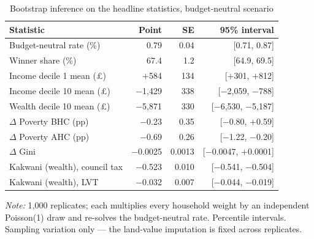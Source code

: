 \begin{table}[htbp]
\centering
\caption{Bootstrap inference on the headline statistics, budget-neutral scenario}
\label{tab:headline_ci}
\begin{tabular}{lrrr}
\toprule
Statistic & Point & SE & 95\% interval \\
\midrule
Budget-neutral rate (\%)                 & 0.79    & 0.04   & [0.71, 0.87] \\
Winner share (\%)                        & 67.4    & 1.2    & [64.9, 69.5] \\
Income decile 1 mean (\pounds)           & $+$584  & 134    & [$+$301, $+$812] \\
Income decile 10 mean (\pounds)          & $-$1{,}429 & 338 & [$-$2{,}059, $-$788] \\
Wealth decile 10 mean (\pounds)          & $-$5{,}871 & 330 & [$-$6{,}530, $-$5{,}187] \\
$\Delta$ Poverty BHC (pp)                & $-$0.23 & 0.35   & [$-$0.80, $+$0.59] \\
$\Delta$ Poverty AHC (pp)                & $-$0.69 & 0.26   & [$-$1.22, $-$0.20] \\
$\Delta$ Gini                            & $-$0.0025 & 0.0013 & [$-$0.0047, $+$0.0001] \\
Kakwani (wealth), council tax            & $-$0.523 & 0.010 & [$-$0.541, $-$0.504] \\
Kakwani (wealth), LVT                    & $-$0.032 & 0.007 & [$-$0.044, $-$0.019] \\
\bottomrule
\end{tabular}

\medskip
{\footnotesize\emph{Note:} 1{,}000 replicates; each multiplies every household weight by an independent Poisson(1) draw and re-solves the budget-neutral rate. Percentile intervals. Sampling variation only --- the land-value imputation is fixed across replicates.}
\end{table}

